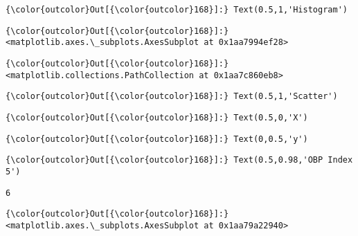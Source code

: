 \documentclass[11pt]{article}
\begin{document}
\begin{Verbatim}[commandchars=\\\{\}]
{\color{outcolor}Out[{\color{outcolor}168}]:} Text(0.5,1,'Histogram')
\end{Verbatim}
            
\begin{Verbatim}[commandchars=\\\{\}]
{\color{outcolor}Out[{\color{outcolor}168}]:} <matplotlib.axes.\_subplots.AxesSubplot at 0x1aa7994ef28>
\end{Verbatim}
            
\begin{Verbatim}[commandchars=\\\{\}]
{\color{outcolor}Out[{\color{outcolor}168}]:} <matplotlib.collections.PathCollection at 0x1aa7c860eb8>
\end{Verbatim}
            
\begin{Verbatim}[commandchars=\\\{\}]
{\color{outcolor}Out[{\color{outcolor}168}]:} Text(0.5,1,'Scatter')
\end{Verbatim}
            
\begin{Verbatim}[commandchars=\\\{\}]
{\color{outcolor}Out[{\color{outcolor}168}]:} Text(0.5,0,'X')
\end{Verbatim}
            
\begin{Verbatim}[commandchars=\\\{\}]
{\color{outcolor}Out[{\color{outcolor}168}]:} Text(0,0.5,'y')
\end{Verbatim}
            
\begin{Verbatim}[commandchars=\\\{\}]
{\color{outcolor}Out[{\color{outcolor}168}]:} Text(0.5,0.98,'OBP Index 5')
\end{Verbatim}
            
    \begin{Verbatim}[commandchars=\\\{\}]
6

    \end{Verbatim}

\begin{Verbatim}[commandchars=\\\{\}]
{\color{outcolor}Out[{\color{outcolor}168}]:} <matplotlib.axes.\_subplots.AxesSubplot at 0x1aa79a22940>
\end{Verbatim}
            
\end{document}
